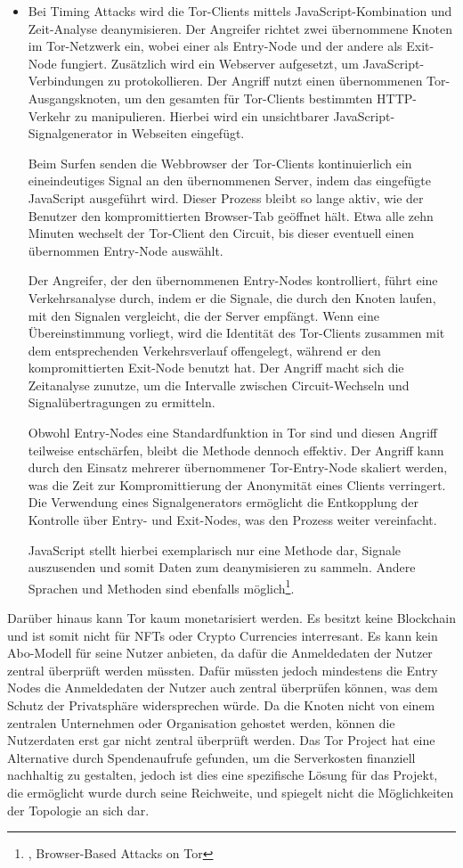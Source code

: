 \begin{itemize}
    \item Bei Timing Attacks wird die Tor-Clients mittels JavaScript-Kombination und Zeit-Analyse deanymisieren. Der Angreifer richtet zwei übernommene Knoten im Tor-Netzwerk ein, wobei einer als Entry-Node und der andere als Exit-Node fungiert. Zusätzlich wird ein Webserver aufgesetzt, um JavaScript-Verbindungen zu protokollieren. Der Angriff nutzt einen übernommenen Tor-Ausgangsknoten, um den gesamten für Tor-Clients bestimmten HTTP-Verkehr zu manipulieren. Hierbei wird ein unsichtbarer JavaScript-Signalgenerator in Webseiten eingefügt.

    Beim Surfen senden die Webbrowser der Tor-Clients kontinuierlich ein eineindeutiges Signal an den übernommenen Server, indem das eingefügte JavaScript ausgeführt wird. Dieser Prozess bleibt so lange aktiv, wie der Benutzer den kompromittierten Browser-Tab geöffnet hält. Etwa alle zehn Minuten wechselt der Tor-Client den Circuit, bis dieser eventuell einen übernommen Entry-Node auswählt.

    Der Angreifer, der den übernommenen Entry-Nodes kontrolliert, führt eine Verkehrsanalyse durch, indem er die Signale, die durch den Knoten laufen, mit den Signalen vergleicht, die der Server empfängt. Wenn eine Übereinstimmung vorliegt, wird die Identität des Tor-Clients zusammen mit dem entsprechenden Verkehrsverlauf offengelegt, während er den kompromittierten Exit-Node benutzt hat. Der Angriff macht sich die Zeitanalyse zunutze, um die Intervalle zwischen Circuit-Wechseln und Signalübertragungen zu ermitteln.

    Obwohl Entry-Nodes eine Standardfunktion in Tor sind und diesen Angriff teilweise entschärfen, bleibt die Methode dennoch effektiv. Der Angriff kann durch den Einsatz mehrerer übernommener Tor-Entry-Node skaliert werden, was die Zeit zur Kompromittierung der Anonymität eines Clients verringert. Die Verwendung eines Signalgenerators ermöglicht die Entkopplung der Kontrolle über Entry- und Exit-Nodes, was den Prozess weiter vereinfacht.

    JavaScript stellt hierbei exemplarisch nur eine Methode dar, Signale auszusenden und somit Daten zum deanymisieren zu sammeln. Andere Sprachen und Methoden sind ebenfalls möglich\footnote{\cite{BrowserBasedAttacksOnTor}, Browser-Based Attacks on Tor}.
\end{itemize}

Darüber hinaus kann Tor kaum monetarisiert werden. Es besitzt keine Blockchain und ist somit nicht für NFTs oder Crypto Currencies interresant. Es kann kein Abo-Modell für seine Nutzer anbieten, da dafür die Anmeldedaten der Nutzer zentral überprüft werden müssten. Dafür müssten jedoch mindestens die Entry Nodes die Anmeldedaten der Nutzer auch zentral überprüfen können, was dem Schutz der Privatsphäre widersprechen würde. Da die Knoten nicht von einem zentralen Unternehmen oder Organisation gehostet werden, können die Nutzerdaten erst gar nicht zentral überprüft werden. Das Tor Project hat eine Alternative durch Spendenaufrufe gefunden, um die Serverkosten finanziell nachhaltig zu gestalten, jedoch ist dies eine spezifische Lösung für das Projekt, die ermöglicht wurde durch seine Reichweite, und spiegelt nicht die Möglichkeiten der Topologie an sich dar.
